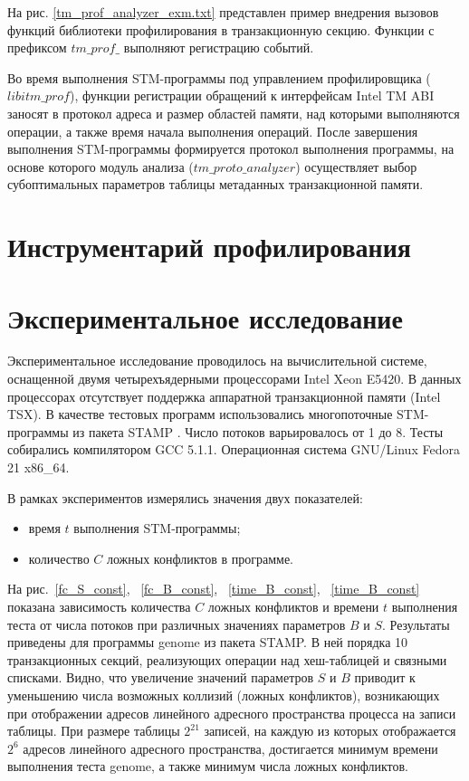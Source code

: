 На рис. \ref{tm_prof_analyzer_exm.txt} представлен пример внедрения вызовов 
функций библиотеки профилирования в транзакционную секцию. Функции с префиксом 
$tm\_prof\_$ выполняют регистрацию событий.


Во время выполнения STM-программы под управлением профилировщика 
($libitm\_prof$), функции регистрации обращений к интерфейсам Intel TM ABI 
заносят в протокол адреса и размер областей памяти, над которыми выполняются 
операции, а также время начала выполнения операций. После завершения выполнения 
STM-программы формируется протокол выполнения программы, на основе которого 
модуль анализа ($tm\_proto\_analyzer$) осуществляет выбор субоптимальных 
параметров таблицы метаданных транзакционной памяти.

\section{Инструментарий профилирования}
\section{Экспериментальное исследование}

Экспериментальное исследование проводилось на вычислительной системе, оснащенной 
двумя четырехъядерными процессорами Intel Xeon E5420. В данных процессорах 
отсутствует поддержка аппаратной транзакционной памяти (Intel TSX). В качестве 
тестовых программ использовались многопоточные STM-программы из пакета STAMP 
\cite{spear_strategy_for_cm, spear_ringstm, dice_shavit_tl2}. Число потоков 
варьировалось от 1 до 8. Тесты собирались компилятором GCC 5.1.1. Операционная 
система GNU/Linux Fedora 21 x86\_64. 

В рамках экспериментов измерялись значения двух показателей:
\begin{itemize}
\item время $t$ выполнения STM-программы;
\item количество $C$ ложных конфликтов в программе.
\end{itemize}

На рис.~\ref{fc_S_const}, ~\ref{fc_B_const}, ~\ref{time_B_const}, 
~\ref{time_B_const} показана зависимость количества $C$ ложных конфликтов и 
времени $t$ выполнения теста от числа потоков при различных значениях параметров 
$B$ и $S$. Результаты приведены для программы genome из пакета STAMP. В ней 
порядка 10 транзакционных секций, реализующих операции над хеш-таблицей и 
связными списками. Видно, что увеличение значений параметров $S$ и $B$ приводит 
к уменьшению числа возможных коллизий (ложных конфликтов), возникающих при 
отображении адресов линейного адресного пространства процесса на записи таблицы. 
При размере таблицы $2^{21}$ записей, на каждую из которых отображается $2^{6}$ 
адресов линейного адресного пространства, достигается минимум времени выполнения 
теста genome, а также минимум числа ложных конфликтов. 

